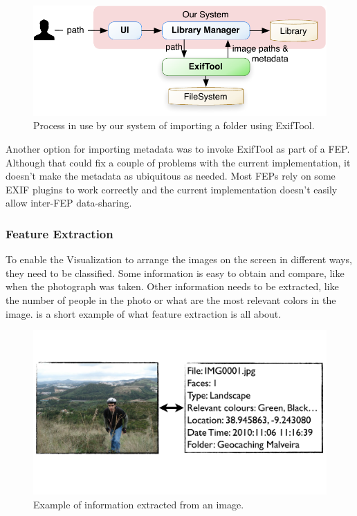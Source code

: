 \begin{figure}[ht]
	\centering
		\includegraphics[scale=0.6]{Figures/import.pdf}
	\caption{Process in use by our system of importing a folder using ExifTool.}
	\label{fig:arch:import}
\end{figure}


Another option for importing metadata was to invoke ExifTool as part of a \ac{FEP}. Although that could fix a couple of problems with the current  implementation, it doesn’t make the metadata as ubiquitous as needed. Most \acp{FEP} rely on some \ac{EXIF} plugins to work correctly and the current implementation doesn’t easily allow inter-\ac{FEP} data-sharing.





\subsubsection{Feature Extraction} %
\label{ssub:FeatureExtraction}

To enable the Visualization to arrange the images on the screen in different ways, they need to be classified. Some information is easy to obtain and compare, like when the photograph was taken. Other information needs to be extracted, like the number of people in the photo or what are the most relevant colors in the image.  is a short example of what feature extraction is all about.

\begin{figure}[ht]
	\centering
		\includegraphics[width=0.72\columnwidth]{Figures/fe.pdf}
	\caption{Example of information extracted from an image.}
	\label{fig:fe}
\end{figure}

